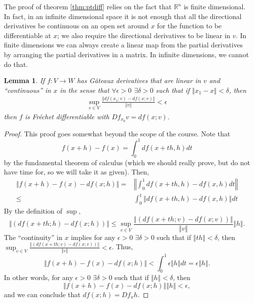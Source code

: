 \documentclass[12pt,reqno]{amsart}
\newtheorem{lemma}{Lemma}[section]
\theoremstyle{definition}
\def\R{\mathbb{R}}
\newcommand{\norm}[1]{\left\Vert {#1} \right\Vert}
\renewcommand{\to}{{\rightarrow}}
\begin{document}
The proof of theorem \ref{thm:ptdiff} relies on the fact that $\R^n$
is finite dimensional. In fact, in an infinite dimensional space it is
not enough that all the directional derivatives be continuous on an
open set around $x$ for the function to be differentiable at $x$; we
also require the directional derivatives to be linear in $v$. In
finite dimensions we can always create a linear map from the partial
derivatives by arranging the partial derivatives in a matrix. In
infinite dimensions, we cannot do that. 
\begin{lemma}\label{lem:gatfre}
  If $f: V \to W$ has G\^{a}teaux derivatives that are linear in $v$
  and ``continuous'' in $x$ in the sense that $\forall \epsilon>0$
  $\exists \delta > 0$ such that if $\norm{x_1 - x} < \delta$, then
  \begin{align*}
    \sup_{v \in V} \frac{\norm{df(x_1;v) - df(x;v)}}{\norm{v}} < \epsilon
  \end{align*}
  then $f$ is Fr\'{e}chet differentiable with $Df_{x_0} v = df(x;v)$.
\end{lemma}
\begin{proof}
  This proof goes somewhat beyond the scope of the course. Note that
  \[ f(x+h) - f(x) = \int_0^1 df(x+th,h) dt \]
  by the fundamental theorem of calculus (which we should really
  prove, but do not have time for, so we will take it as given). Then,
  \begin{align*}
    \norm{ f(x+h) - f(x) - df(x;h)} = & \norm{ \int_0^1 df(x+th,h) -
      df(x,h) dt} \\
    \leq & \int_0^1 \norm{df(x+th,h) -df(x,h)} dt
  \end{align*}
  By the definition of $\sup$, 
  \[ \norm{\left(df(x+th;h) - df(x;h) \right)} \leq \sup_{v \in V}
  \frac{\norm{\left(df(x+th;v) - df(x;v)
      \right)}}{\norm{v}}\norm{h}. \] 
  The ``continuity'' in $x$ implies for any $\epsilon>0$ $\exists
  \delta > 0$ such that if $\norm{th} < \delta$, then $\sup_{v \in V}
  \frac{\norm{\left(df(x+th;v) - df(x;v) \right)}}{\norm{v}} < \epsilon$.
  Thus,
  \[ 
  \norm{ f(x+h) - f(x) - df(x;h)} < \int_0^1 \epsilon \norm{h} dt =
  \epsilon \norm{h}. \]
  In other words, for any $\epsilon>0$ $\exists \delta>0$ such that
  if $\norm{h} < \delta$, then 
  \[ \norm{f(x+h) - f(x) - df(x;h)}{\norm{h}}< \epsilon, \]
  and we can conclude that $df(x;h) = Df_x h$. 
\end{proof}
\end{document}

